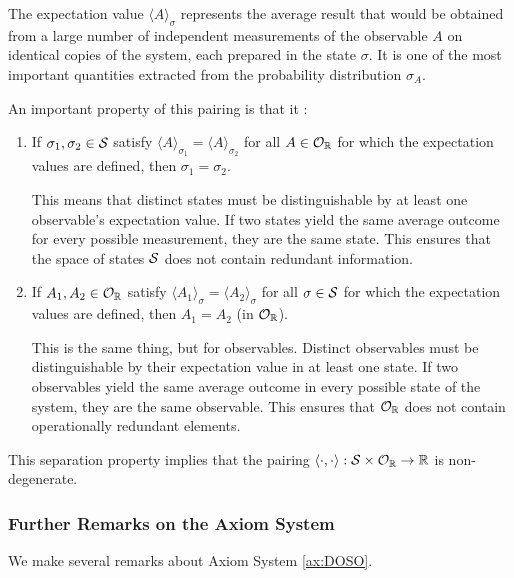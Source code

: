 The expectation value $\langle A \rangle_{\sigma}$ represents the average result that would be obtained from a large number of independent measurements of the observable $A$ on identical copies of the system, each prepared in the state $\sigma$. It is one of the most important quantities extracted from the probability distribution $\sigma_A$.

An important property of this pairing is that it :
\begin{enumerate}
    \item If $\sigma_{1}, \sigma_{2}\in\mathcal{S}$ satisfy $\langle A\rangle_{\sigma_{1}}=\langle A\rangle_{\sigma_{2}}$ for all $A\in\mathcal{O}_{\mathbb{R}}$ for which the expectation values are defined, then $\sigma_{1}=\sigma_{2}$.
    
    This means that distinct states must be distinguishable by at least one observable's expectation value. If two states yield the same average outcome for every possible measurement, they are the same state. This ensures that the space of states $\mathcal{S}$ does not contain redundant information.
    
    \item If $A_{1}, A_{2}\in\mathcal{O}_{\mathbb{R}}$ satisfy $\langle A_{1}\rangle_{\sigma}=\langle A_{2}\rangle_{\sigma}$ for all $\sigma\in\mathcal{S}$ for which the expectation values are defined, then $A_{1}=A_{2}$ (in $\mathcal{O}_{\mathbb{R}}$).
    
    This is the same thing, but for observables. Distinct observables must be distinguishable by their expectation value in at least one state. If two observables yield the same average outcome in every possible state of the system, they are the same observable. This ensures that $\mathcal{O}_{\mathbb{R}}$ does not contain operationally redundant elements.
\end{enumerate}
This separation property implies that the pairing $\langle \cdot, \cdot \rangle : \mathcal{S} \times \mathcal{O}_{\mathbb{R}} \to \mathbb{R}$ is non-degenerate.

\subsubsection{Further Remarks on the Axiom System}

We make several remarks about Axiom System \ref{ax:DOSO}.

